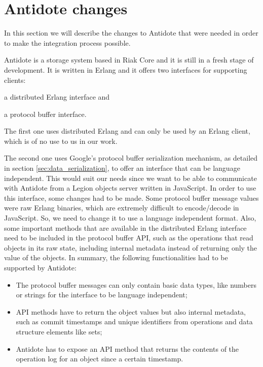 \section{Antidote changes}
\label{sec:antidote_changes}
In this section we will describe the changes to Antidote that were needed in order to make the integration process possible.\par
	Antidote is a storage system based in Riak Core and it is still in a fresh stage of development. It is written in Erlang and it offers two interfaces for supporting clients: 
\begin{enumerate*}[(i)]
\item a distributed Erlang interface and 
\item a protocol buffer interface.
\end{enumerate*}
\par
	The first one uses distributed Erlang and can only be used by an Erlang client, which is of no use to us in our work.\par
	The second one uses Google's protocol buffer serialization mechanism, as detailed in section \ref{sec:data_serialization}, to offer an interface that can be language independent. This would suit our needs since we want to be able to communicate with Antidote from a Legion objects server written in JavaScript. In order to use this interface, some changes had to be made. Some protocol buffer message values were raw Erlang binaries, which are extremely difficult to encode/decode in JavaScript. So, we need to change it to use a language independent format. Also, some important methods that are available in the distributed Erlang interface need to be included in the protocol buffer API, such as the operations that read objects in its raw state, including internal metadata instead of returning only the value of the objects. In summary, the following functionalities had to be supported by Antidote:
	\begin{itemize}
	\item The protocol buffer messages can only contain basic data types, like numbers or strings for the interface to be language independent;
	\item API methods have to return the object values but also internal metadata, such as commit timestamps and unique identifiers from operations and data structure elements like sets;
	\item Antidote has to expose an API method that returns the contents of the operation log for an object since a certain timestamp.
	\end{itemize}
